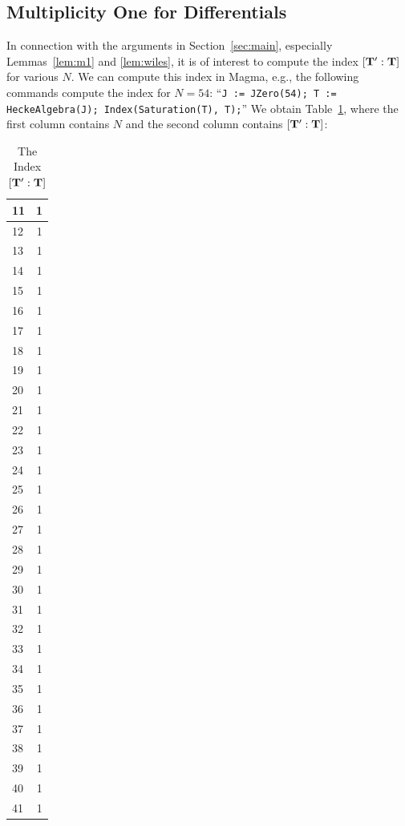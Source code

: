 \documentclass[10pt,twoside]{article}
\newcommand{\T}{{\bf{T}}}
\theoremstyle{definition}
\begin{document}
\subsection{Multiplicity One for
  Differentials}\label{sec:dataind}
In connection with the arguments in Section~\ref{sec:main}, especially
Lemmas~\ref{lem:m1} and \ref{lem:wiles}, it is of interest
to compute the index $[\T':\T]$ for various $N$.
We can compute this index in Magma, e.g., the following
commands compute the index for $N=54$:
``{\tt J := JZero(54); T := HeckeAlgebra(J); Index(Saturation(T), T);}''
We obtain Table~\ref{table:index}, where the first column
contains $N$ and the second column contains $[\T':\T]$:
\begin{table}\caption{The Index $[\T':\T]$\label{table:index}}
\begin{center}
\begin{tabular}{|l|c|}\hline
11 & 1 \\\hline
12 & 1 \\\hline
13 & 1 \\\hline
14 & 1 \\\hline
15 & 1 \\\hline
16 & 1 \\\hline
17 & 1 \\\hline
18 & 1 \\\hline
19 & 1 \\\hline
20 & 1 \\\hline
21 & 1 \\\hline
22 & 1 \\\hline
23 & 1 \\\hline
24 & 1 \\\hline
25 & 1 \\\hline
26 & 1 \\\hline
27 & 1 \\\hline
28 & 1 \\\hline
29 & 1 \\\hline
30 & 1 \\\hline
31 & 1 \\\hline
32 & 1 \\\hline
33 & 1 \\\hline
34 & 1 \\\hline
35 & 1 \\\hline
36 & 1 \\\hline
37 & 1 \\\hline
38 & 1 \\\hline
39 & 1 \\\hline
40 & 1 \\\hline
41 & 1 \\\hline

\end{tabular}
\end{center}
\end{table}
\end{document}
